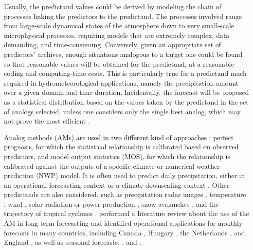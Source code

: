 \documentclass[review]{elsarticle}
\begin{document}
Usually, the predictand values could be derived by modeling the chain of processes linking the predictors to the predictand. The processes involved range from large-scale dynamical states of the atmosphere down to very small-scale microphysical processes, requiring models that are extremely complex, data demanding, and time-consuming. Conversely, given an appropriate set of predictors' archives, enough situations analogous to a target one could be found so that reasonable values will be obtained for the predictand, at a reasonable coding and computing-time costs. This is particularly true for a predictand much required in hydrometeorological applications, namely the precipitation amount over a given domain and time duration. Incidentally, the forecast will be proposed as a statistical distribution based on the values taken by the predictand in the set of analogs selected, unless one considers only the single best analog, which may not prove the most efficient \citep{Bontron2005}.

Analog methods (AMs) are used in two different kind of approaches \citep{Rummukainen1997}: perfect prognosis, for which the statistical relationship is calibrated based on observed predictors, and model output statistics (MOS), for which the relationship is calibrated against the outputs of a specific climate or numerical weather prediction (NWP) model. It is often used to predict daily precipitation, either in an operational forecasting context \citep[e.g.][]{Guilbaud1997, Bontron2005, Hamill2006, Bliefernicht2010, Marty2012, Horton2012, Hamill2015, BenDaoud2016} or a climate downscaling context \citep[e.g.][]{Zorita1999, Wetterhall2005, Wetterhall2007, Matulla2007, Radanovics2013, Chardon2014, Dayon2015, Raynaud2016b}. Other predictands are also considered, such as precipitation radar images \citep{Panziera2011,Foresti2015a}, temperature \citep{Radinovic1975, Woodcock1980, Kruizinga1983, DelleMonache2013, Caillouet2016, Raynaud2016b}, wind \citep{Gordon1987, DelleMonache2013, DelleMonache2011, Vanvyve2015, Alessandrini2015, Junk2015, Junk2015c}, solar radiation or power production \citep{Alessandrini2015a, Bessa2015, Raynaud2016b}, snow avalanches \citep{Obled1980, Bolognesi1993}, and the trajectory of tropical cyclones \citep{Keenan1981, Sievers2000, Fraedrich2003}. \citet{Guilbaud1997} performed a literature review about the use of the AM in long-term forecasting and identified operational applications for monthly forecasts in many countries, including Canada \citep{Shabbar1986},  Hungary \citep{Toth1989}, the Netherlands \citep{Nap1981}, and England \citep{Murray1974}, as well as seasonal forecasts: \citet{Barnett1978}, \citet{Bergen1982} and \citet{Livezey1988}.
\end{document}
